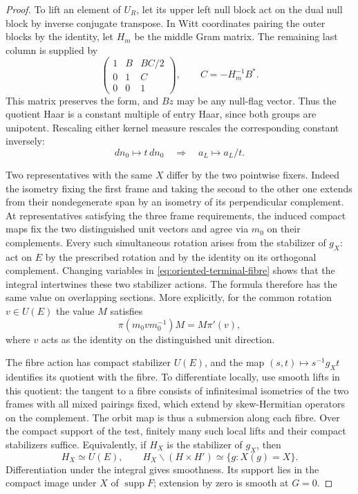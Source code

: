 \begin{proof}
To lift an element of \(U_R\), let its upper left null block act on
the dual null block by inverse conjugate transpose. In Witt coordinates
pairing the outer blocks by the identity, let \(H_m\) be the middle
Gram matrix. The remaining last column is supplied by
\[
 \begin{pmatrix}1&B&BC/2\\0&1&C\\0&0&1\end{pmatrix},
 \qquad C=-H_m^{-1}B^* .
\]
This matrix preserves the form, and \(Bz\) may be any null-flag vector.
Thus the quotient Haar is a constant multiple of entry Haar, since
both groups are unipotent. Rescaling either kernel measure rescales
the corresponding constant inversely:
\[
    dn_0\mapsto t\,dn_0 \quad\Longrightarrow\quad a_L\mapsto a_L/t .
\]

Two representatives with the same \(X\) differ by the two
pointwise fixers. Indeed the isometry fixing the first frame and
taking the second to the other one extends from their nondegenerate
span by an isometry of its perpendicular complement. At representatives
satisfying the three frame requirements, the induced compact
maps fix the two distinguished unit vectors and agree via \(m_0\)
on their complements. Every such simultaneous rotation arises from
the stabilizer of \(g_X\): act on \(E\) by the prescribed rotation
and by the identity on its orthogonal complement. Changing variables
in \eqref{eq:oriented-terminal-fibre} shows that the integral
intertwines these two stabilizer actions. The formula therefore
has the same value on overlapping sections. More explicitly, for
the common rotation \(v\in U(E)\) the value \(M\) satisfies
\[
             \pi(m_0 v m_0^{-1})M=M\pi'(v),
\]
where \(v\) acts as the identity on the distinguished unit direction.

The fibre action has compact stabilizer \(U(E)\), and the map
\((s,t)\mapsto s^{-1}g_Xt\) identifies its quotient with the
fibre. To differentiate locally, use smooth lifts in this quotient:
the tangent to a fibre consists of infinitesimal isometries of the
two frames with all mixed pairings fixed, which extend by
skew-Hermitian operators on the complement. The orbit map is thus a
submersion along each fibre. Over the compact support of the test,
finitely many such local lifts and their compact stabilizers suffice.
Equivalently, if \(H_X\) is the stabilizer of \(g_X\), then
\[
 H_X\simeq U(E),\qquad H_X\backslash(H\times H')\simeq\{g:X(g)=X\}.
\]
Differentiation under the integral gives smoothness. Its support
lies in the compact image under \(X\) of \(\operatorname{supp}F\);
extension by zero is smooth at \(G=0\).


\end{proof}

